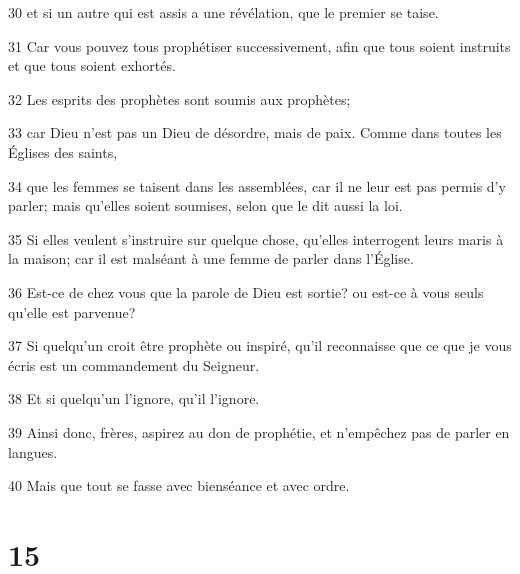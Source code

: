 \par 30 et si un autre qui est assis a une révélation, que le premier se taise.
\par 31 Car vous pouvez tous prophétiser successivement, afin que tous soient instruits et que tous soient exhortés.
\par 32 Les esprits des prophètes sont soumis aux prophètes;
\par 33 car Dieu n'est pas un Dieu de désordre, mais de paix. Comme dans toutes les Églises des saints,
\par 34 que les femmes se taisent dans les assemblées, car il ne leur est pas permis d'y parler; mais qu'elles soient soumises, selon que le dit aussi la loi.
\par 35 Si elles veulent s'instruire sur quelque chose, qu'elles interrogent leurs maris à la maison; car il est malséant à une femme de parler dans l'Église.
\par 36 Est-ce de chez vous que la parole de Dieu est sortie? ou est-ce à vous seuls qu'elle est parvenue?
\par 37 Si quelqu'un croit être prophète ou inspiré, qu'il reconnaisse que ce que je vous écris est un commandement du Seigneur.
\par 38 Et si quelqu'un l'ignore, qu'il l'ignore.
\par 39 Ainsi donc, frères, aspirez au don de prophétie, et n'empêchez pas de parler en langues.
\par 40 Mais que tout se fasse avec bienséance et avec ordre.

\chapter{15}

